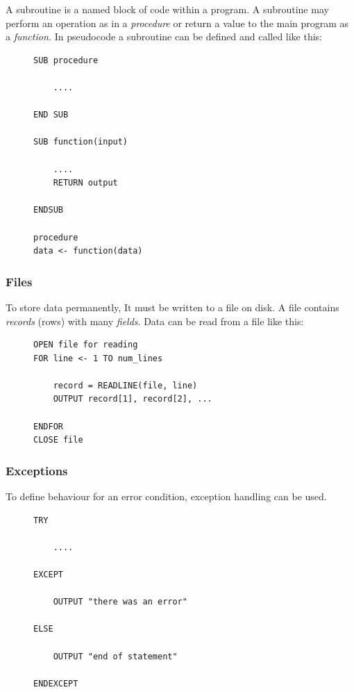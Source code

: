 \documentclass[9pt]{article}
\begin{document}
A subroutine is a named block of code within a program. A subroutine may perform an operation as in a \emph{procedure} or return a value to the main program as a \emph{function.} In pseudocode a subroutine can be defined and called like this:

\begin{figure}[H]
\begin{verbatim}
SUB procedure

    ....

END SUB

SUB function(input)

    ....
    RETURN output

ENDSUB

procedure
data <- function(data)
\end{verbatim}
\end{figure}

\subsubsection{Files}
\label{sec:org4fd4c41}

To store data permanently, It must be written to a file on disk. A file contains \emph{records} (rows) with many \emph{fields}. Data can be read from a file like this:

\begin{figure}[H]
\begin{verbatim}
OPEN file for reading
FOR line <- 1 TO num_lines

    record = READLINE(file, line)
    OUTPUT record[1], record[2], ...

ENDFOR
CLOSE file
\end{verbatim}
\end{figure}

\subsubsection{Exceptions}
\label{sec:orgb54f198}

To define behaviour for an error condition, exception handling can be used.

\begin{figure}[H]
\begin{verbatim}
TRY

    ....

EXCEPT

    OUTPUT "there was an error"

ELSE

    OUTPUT "end of statement"

ENDEXCEPT
\end{verbatim}
\end{figure}
\end{document}
